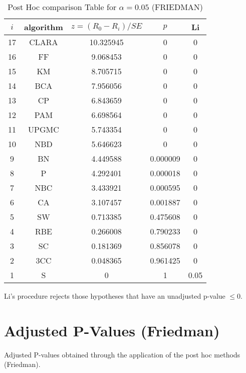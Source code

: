 \documentclass[a4paper,10pt]{article}
\begin{document}
\begin{landscape}
\begin{table}[!htp]
\centering\footnotesize
\begin{tabular}{ccccc}
$i$&algorithm&$z=(R_0 - R_i)/SE$&$p$&Li\\
\hline17&CLARA&10.325945&0&0\\16&FF&9.068453&0&0\\15&KM&8.705715&0&0\\14&BCA&7.956056&0&0\\13&CP&6.843659&0&0\\12&PAM&6.698564&0&0\\11&UPGMC&5.743354&0&0\\10&NBD&5.646623&0&0\\9&BN&4.449588&0.000009&0\\8&P&4.292401&0.000018&0\\7&NBC&3.433921&0.000595&0\\6&CA&3.107457&0.001887&0\\5&SW&0.713385&0.475608&0\\4&RBE&0.266008&0.790233&0\\3&SC&0.181369&0.856078&0\\2&3CC&0.048365&0.961425&0\\1&S&0&1&0.05\\\hline
\end{tabular}
\caption{Post Hoc comparison Table for $\alpha=0.05$ (FRIEDMAN)}
\end{table}Li's procedure rejects those hypotheses that have an unadjusted p-value $\le0$.


\newpage

\section{Adjusted P-Values (Friedman)}


Adjusted P-values obtained through the application of the post hoc methods (Friedman).


\end{landscape}
\end{document}
